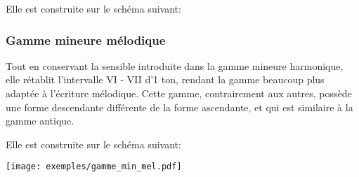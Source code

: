 \documentclass[11pt]{scrreprt}
\begin{document}
Elle est construite sur le schéma suivant: 
\begin{center}
\end{center}

\subsubsection{Gamme mineure mélodique}
Tout en conservant la sensible introduite dans la gamme mineure harmonique, elle rétablit l'intervalle VI - VII d'1 ton, rendant la gamme beaucoup plus adaptée à l'écriture mélodique. Cette gamme, contrairement aux autres, possède une forme descendante différente de la forme ascendante, et qui est similaire à la gamme antique.

Elle est construite sur le schéma suivant: 
\begin{center}
\end{center}
\begin{center}
   \texttt{[image: exemples/gamme\_min\_mel.pdf]}
\end{center}

\begin{center}
\end{center}
\end{document}
